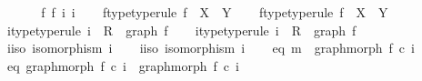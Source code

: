 \begin{isabellebody}
\ \ \isamarkupfalse%
\isanewline
{}\isamarkupfalse%
\isanewline
\ \ \isamarkupfalse%
\ f{}\ f{}\ i{}\ i{}\isanewline
\ \ \isamarkupfalse%
\ f{}{\isacharunderscore}{\kern0pt}type{\isacharbrackleft}{\kern0pt}type{\isacharunderscore}{\kern0pt}rule{\isacharbrackright}{\kern0pt}{\isacharcolon}{\kern0pt}\ {\isachardoublequoteopen}f{}\ {\isacharcolon}{\kern0pt}\ X\ {\isasymrightarrow}\ Y{\isachardoublequoteclose}\isanewline
\ \ \isamarkupfalse%
\ f{}{\isacharunderscore}{\kern0pt}type{\isacharbrackleft}{\kern0pt}type{\isacharunderscore}{\kern0pt}rule{\isacharbrackright}{\kern0pt}{\isacharcolon}{\kern0pt}\ {\isachardoublequoteopen}f{}\ {\isacharcolon}{\kern0pt}\ X\ {\isasymrightarrow}\ Y{\isachardoublequoteclose}\isanewline
\ \ \isamarkupfalse%
\ i{}{\isacharunderscore}{\kern0pt}type{\isacharbrackleft}{\kern0pt}type{\isacharunderscore}{\kern0pt}rule{\isacharbrackright}{\kern0pt}{\isacharcolon}{\kern0pt}\ {\isachardoublequoteopen}i{}\ {\isacharcolon}{\kern0pt}\ R\ {\isasymrightarrow}\ graph\ f{}{\isachardoublequoteclose}\isanewline
\ \ \isamarkupfalse%
\ i{}{\isacharunderscore}{\kern0pt}type{\isacharbrackleft}{\kern0pt}type{\isacharunderscore}{\kern0pt}rule{\isacharbrackright}{\kern0pt}{\isacharcolon}{\kern0pt}\ {\isachardoublequoteopen}i{}\ {\isacharcolon}{\kern0pt}\ R\ {\isasymrightarrow}\ graph\ f{}{\isachardoublequoteclose}\isanewline
\ \ \isamarkupfalse%
\ i{}{\isacharunderscore}{\kern0pt}iso{\isacharcolon}{\kern0pt}\ {\isachardoublequoteopen}isomorphism\ i{}{\isachardoublequoteclose}\isanewline
\ \ \isamarkupfalse%
\ i{}{\isacharunderscore}{\kern0pt}iso{\isacharcolon}{\kern0pt}\ {\isachardoublequoteopen}isomorphism\ i{}{\isachardoublequoteclose}\isanewline
\ \ \isamarkupfalse%
\ eq{}{\isacharcolon}{\kern0pt}\ {\isachardoublequoteopen}m\ {\isacharequal}{\kern0pt}\ graph{\isacharunderscore}{\kern0pt}morph\ f{}\ {\isasymcirc}\isactrlsub c\ i{}{\isachardoublequoteclose}\isanewline
\ \ \isamarkupfalse%
\ eq{}{\isacharcolon}{\kern0pt}\ {\isachardoublequoteopen}graph{\isacharunderscore}{\kern0pt}morph\ f{}\ {\isasymcirc}\isactrlsub c\ i{}\ {\isacharequal}{\kern0pt}\ graph{\isacharunderscore}{\kern0pt}morph\ f{}\ {\isasymcirc}\isactrlsub c\ i{}{\isachardoublequoteclose}\ \isanewline

\end{isabellebody}
